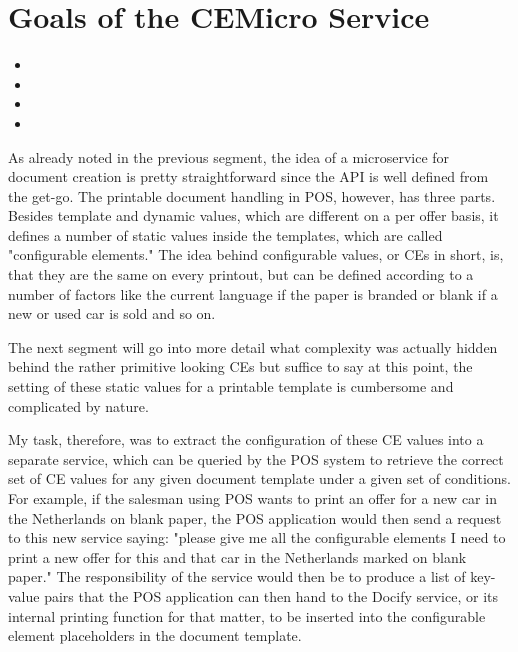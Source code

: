 \section{Goals of the CEMicro Service}

\begin{itemize}
  \item {}
  \item {}
  \item {}
  \item {}
\end{itemize}


As already noted in the previous segment, the idea of a microservice for document creation is pretty straightforward since the API is well defined from the get-go. The printable document handling in POS, however, has three parts. Besides template and dynamic values, which are different on a per offer basis, it defines a number of static values inside the templates, which are called "configurable elements." The idea behind configurable values, or CEs in short, is, that they are the same on every printout, but can be defined according to a number of factors like the current language if the paper is branded or blank if a new or used car is sold and so on.

The next segment will go into more detail what complexity was actually hidden behind the rather primitive looking CEs but suffice to say at this point, the setting of these static values for a printable template is cumbersome and complicated by nature.

My task, therefore, was to extract the configuration of these CE values into a separate service, which can be queried by the POS system to retrieve the correct set of CE values for any given document template under a given set of conditions. For example, if the salesman using POS wants to print an offer for a new car in the Netherlands on blank paper, the POS application would then send a request to this new service saying: "please give me all the configurable elements I need to print a new offer for this and that car in the Netherlands marked on blank paper." The responsibility of the service would then be to produce a list of key-value pairs that the POS application can then hand to the Docify service, or its internal printing function for that matter, to be inserted into the configurable element placeholders in the document template.

